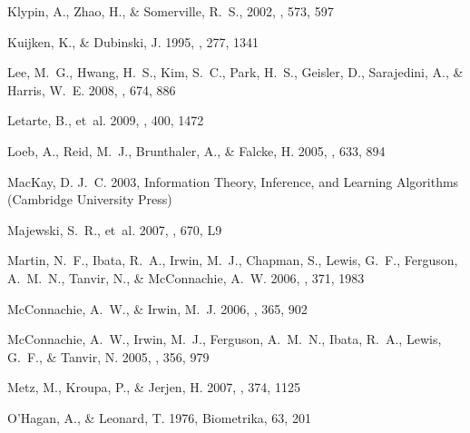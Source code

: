 \documentclass[preprint]{aastex}
\begin{document}
\begin{thebibliography}{}
{Klypin}, A., {Zhao}, H., \& {Somerville}, R.~S.,
2002, \apj, 573, 597

{Kuijken}, K., \& {Dubinski}, J. 1995, \mnras, 277, 1341

{Lee}, M.~G., {Hwang}, H.~S., {Kim}, S.~C., {Park}, H.~S., {Geisler}, D.,
  {Sarajedini}, A., \& {Harris}, W.~E. 2008, \apj, 674, 886

{Letarte}, B., {et~al.} 2009, \mnras, 400, 1472

{Loeb}, A., {Reid}, M.~J., {Brunthaler}, A., \& {Falcke}, H. 2005, \apj, 633,
  894

{MacKay}, D. J.~C. 2003, Information Theory, Inference, and Learning Algorithms
  (Cambridge University Press)

{Majewski}, S.~R., {et~al.} 2007, \apjl, 670, L9

{Martin}, N.~F., {Ibata}, R.~A., {Irwin}, M.~J., {Chapman}, S., {Lewis}, G.~F.,
  {Ferguson}, A.~M.~N., {Tanvir}, N., \& {McConnachie}, A.~W. 2006, \mnras,
  371, 1983

{McConnachie}, A.~W., \& {Irwin}, M.~J. 2006, \mnras, 365, 902

{McConnachie}, A.~W., {Irwin}, M.~J., {Ferguson}, A.~M.~N., {Ibata}, R.~A.,
  {Lewis}, G.~F., \& {Tanvir}, N. 2005, \mnras, 356, 979

{Metz}, M., {Kroupa}, P., \& {Jerjen}, H. 2007, \mnras, 374, 1125

O'Hagan, A., \& Leonard, T. 1976, Biometrika, 63, 201


\end{thebibliography}
\end{document}
